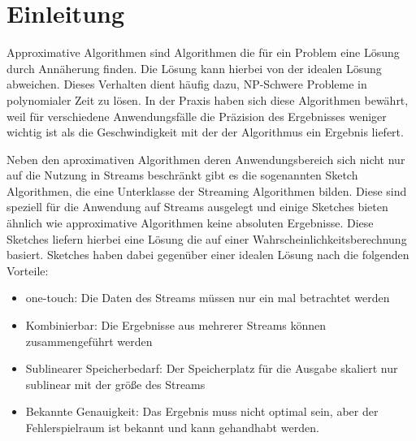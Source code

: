 \section{Einleitung}
Approximative Algorithmen sind Algorithmen die für ein Problem eine Lösung durch Annäherung finden. Die Lösung kann hierbei von der idealen Lösung abweichen. Dieses Verhalten dient häufig dazu, NP-Schwere Probleme in polynomialer Zeit zu lösen.
In der Praxis haben sich diese Algorithmen bewährt, weil für verschiedene Anwendungsfälle die Präzision des Ergebnisses weniger wichtig ist als die Geschwindigkeit mit der der Algorithmus ein Ergebnis liefert.

Neben den aproximativen Algorithmen deren Anwendungsbereich sich nicht nur auf die Nutzung in Streams beschränkt gibt es die sogenannten Sketch Algorithmen, die eine Unterklasse der Streaming Algorithmen bilden. Diese sind speziell für die Anwendung auf Streams ausgelegt und einige Sketches bieten ähnlich wie approximative Algorithmen keine absoluten Ergebnisse. Diese Sketches liefern hierbei eine Lösung die auf einer Wahrscheinlichkeitsberechnung basiert.
Sketches haben dabei gegenüber einer idealen Lösung nach \cite{apachedatasketches} die folgenden Vorteile:
\begin{itemize}
\item one-touch: Die Daten des Streams müssen nur ein mal betrachtet werden
\item Kombinierbar: Die Ergebnisse aus mehrerer Streams können zusammengeführt werden
\item Sublinearer Speicherbedarf: Der Speicherplatz für die Ausgabe skaliert nur sublinear mit der größe des Streams
\item Bekannte Genauigkeit: Das Ergebnis muss nicht optimal sein, aber der Fehlerspielraum ist bekannt und kann gehandhabt werden.
\end{itemize}



